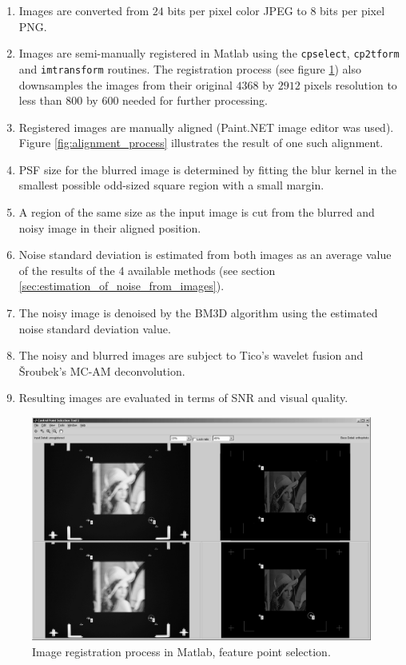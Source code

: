 \documentclass[12pt,notitlepage]{report}
\begin{document}
\begin{enumerate}
\item Images are converted from $24$ bits per pixel color JPEG to $8$ bits per pixel PNG.
\item Images are semi-manually registered in Matlab using the \texttt{cpselect}, \texttt{cp2tform} and \texttt{imtransform} routines. The registration process (see figure \ref{fig:registration_process}) also downsamples the images from their original $4368$ by $2912$ pixels resolution to less than $800$ by $600$ needed for further processing. 
\item Registered images are manually aligned (Paint.NET image editor was used). Figure \ref{fig:alignment_process} illustrates the result of one such alignment.
\item PSF size for the blurred image is determined by fitting the blur kernel in the smallest possible odd-sized square region with a small margin.
\item A region of the same size as the input image is cut from the blurred and noisy image in their aligned position.
\item Noise standard deviation is estimated from both images as an average value of the results of the 4 available methods (see section \ref{sec:estimation_of_noise_from_images}).
\item The noisy image is denoised by the BM3D algorithm using the estimated noise standard deviation value.
\item The noisy and blurred images are subject to Tico's wavelet fusion and Šroubek's MC-AM deconvolution.
\item Resulting images are evaluated in terms of SNR and visual quality.
\end{enumerate}

\begin{figure}[htb]
 \begin{center}
  \includegraphics[width=12cm]{registration_process.png}
 \end{center}
 \caption{Image registration process in Matlab, feature point selection.}
 \label{fig:registration_process}
\end{figure}
\end{document}

